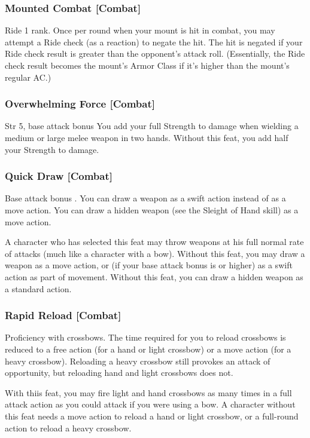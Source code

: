 \subsubsection{Mounted Combat [Combat]}
 Ride 1 rank.
 Once per round when your mount is hit in combat, you may attempt a Ride check (as a reaction) to negate the hit. The hit is negated if your Ride check result is greater than the opponent's attack roll. (Essentially, the Ride check result becomes the mount's Armor Class if it's higher than the mount's regular AC.)%

\subsubsection{Overwhelming Force [Combat]}
 Str 5, base attack bonus 
 You add your full Strength to damage when wielding a medium or large melee weapon in two hands.
 Without this feat, you add half your Strength to damage.

\subsubsection{Quick Draw [Combat]}
 Base attack bonus .
 You can draw a weapon as a swift action instead of as a move action. You can draw a hidden weapon (see the Sleight of Hand skill) as a move action.
\par A character who has selected this feat may throw weapons at his full normal rate of attacks (much like a character with a bow).
 Without this feat, you may draw a weapon as a move action, or (if your base attack bonus is  or higher) as a swift action as part of movement. Without this feat, you can draw a hidden weapon as a standard action.%

\subsubsection{Rapid Reload [Combat]}
 Proficiency with crossbows.
 The time required for you to reload crossbows is reduced to a free action (for a hand or light crossbow) or a move action (for a heavy crossbow). Reloading a heavy crossbow still provokes an attack of opportunity, but reloading hand and light crossbows does not.
\par With thiis feat, you may fire light and hand crossbows as many times in a full attack action as you could attack if you were using a bow.
 A character without this feat needs a move action to reload a hand or light crossbow, or a full-round action to reload a heavy crossbow.

